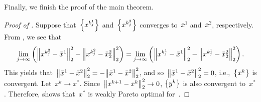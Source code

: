 \documentclass[../main]{subfiles}
\begin{document}
Finally, we finish the proof of the main theorem.
\begin{proof}[Proof of ]
    Suppose that~$\set*{x^{k^1_j}}$ and~$\set*{x^{k^2_j}}$ converges to~$\bar{x}^1$ and~$\bar{x}^2$, respectively.
    From , we see that
    \begin{equation}
        \lim_{j \to \infty} \left( \norm*{x^{k^2_j} - \bar{x}^1}_2^2 - \norm*{x^{k^2_j} - \bar{x}_2^2}_2^2 \right) = \lim_{j \to \infty} \left( \norm*{x^{k^1_j} - \bar{x}^1}_2^2 - \norm*{x^{k^1_j} - \bar{x}_2^2}_2^2 \right) 
    .\end{equation} 
    This yields that~$\norm*{\bar{x}^1 - \bar{x}^2}_2^2 = - \norm*{\bar{x}^1 - \bar{x}^2}_2^2$, and so~$\norm*{\bar{x}^1 - \bar{x}^2}_2^2 = 0$, i.e.,~$\set*{x^k}$ is convergent.
    Let~$x^k \to x^\ast$.
    Since~$\norm*{x^{k + 1} - x^k}_2^2 \to 0$, $\set*{y^k}$ is also convergent to~$x^\ast$.
    Therefore,  shows that~$x^\ast$ is weakly Pareto optimal for~.
\end{proof}
\end{document}
